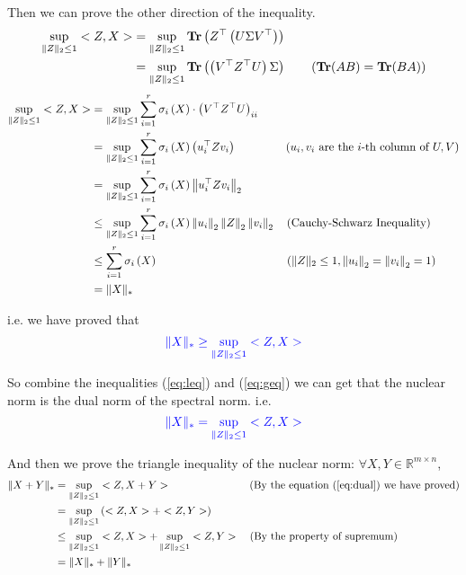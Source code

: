 Then we can prove the other direction of the inequality. \\
\begin{align*}
\sup_{\|Z\|_2 \leq 1} <Z,X> &= \sup_{\|Z\|_2 \leq 1} \mathop{\bf Tr}\left(Z^{\top}\left(U\Sigma V^{\top}\right)\right) \\
&= \sup_{\|Z\|_2 \leq 1} \mathop{\bf Tr}\left(\left(V^{\top}Z^{\top}U\right)\Sigma\right) \text{\qquad ($\mathop{\bf Tr}(AB)=\mathop{\bf Tr}(BA)$)}
\end{align*}
\begin{align*}
\sup_{\|Z\|_2 \leq 1} <Z,X> &= \sup_{\|Z\|_2 \leq 1} \sum_{i=1}^{r}\sigma_i\left(X\right)\cdot\left(V^{\top}Z^{\top}U\right)_{ii} \\
&= \sup_{\|Z\|_2 \leq 1} \sum_{i=1}^{r}\sigma_i\left(X\right)\left(u_i^{\top}Zv_i\right) \text{\qquad\qquad\ ($u_i,v_i$ are the $i$-th column of $U,V$)} \\
&= \sup_{\|Z\|_2 \leq 1} \sum_{i=1}^{r}\sigma_i\left(X\right)\left\|u_i^{\top}Zv_i\right\|_2 \\
&\leq \sup_{\|Z\|_2 \leq 1} \sum_{i=1}^{r}\sigma_i\left(X\right)\left\|u_i\right\|_2\left\|Z\right\|_2\left\|v_i\right\|_2 \text{\quad (Cauchy-Schwarz Inequality)} \\
&\leq \sum_{i=1}^{r}\sigma_i\left(X\right) \text{\qquad\qquad\qquad\qquad\qquad\quad\ ($\|Z\|_2\leq 1, \left\|u_i\right\|_2=\left\|v_i\right\|_2=1$)} \\
&= \|X\|_*
\end{align*}


i.e. we have proved that
\begin{equation}
\textcolor{blue}{\|X\|_* \geq \sup_{\|Z\|_2 \leq 1} <Z,X>}
\label{eq:geq}
\end{equation}

So combine the inequalities (\ref{eq:leq}) and (\ref{eq:geq}) we can get that the nuclear norm is the dual norm of the spectral norm. i.e.
\begin{equation}
\textcolor{blue}{\|X\|_* = \sup_{\|Z\|_2 \leq 1} <Z,X>}
\label{eq:dual}
\end{equation}


And then we prove the triangle inequality of the nuclear norm: $\forall X,Y\in\mathbb{R}^{m\times n}$,
\begin{align*}
\|X+Y\|_* &= \sup_{\|Z\|_2 \leq 1} <Z,X+Y> \text{\quad\quad\quad\quad\quad\quad\quad\  (By the equation (\ref{eq:dual}) we have proved)} \\
&= \sup_{\|Z\|_2 \leq 1} \left(<Z,X>+<Z,Y>\right) \\
&\leq \sup_{\|Z\|_2 \leq 1} <Z,X> + \sup_{\|Z\|_2 \leq 1} <Z,Y> \text{\quad (By the property of supremum)} \\
&= \|X\|_* + \|Y\|_*
\end{align*}

